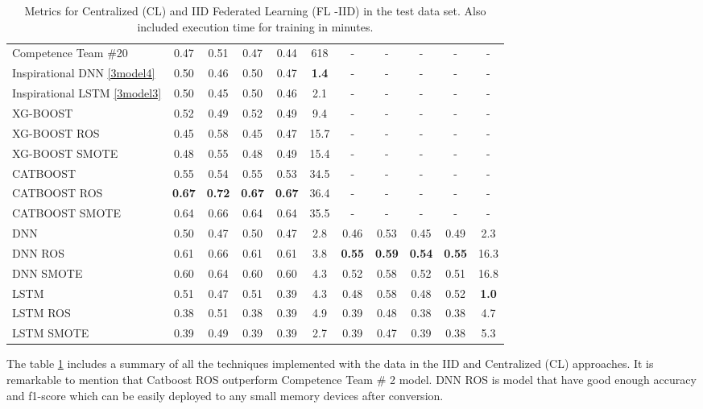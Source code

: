 \begin{table}[ht]
\begin{center}
\begin{adjustbox}{width=\textwidth}
\begin{tabular}{|l|*{5}{c}|*{5}{c}|}
\multicolumn{1}{|l|}{Competence Team \#20 \cite{team_20}} & 0.47 & 0.51 & 0.47 & 0.44 & 618 & - & - & - & - & - \\
\multicolumn{1}{|l|}{Inspirational DNN \ref{3model4}} & 0.50 & 0.46 & 0.50 & 0.47 & \textbf{1.4} & - & - & - & - & -  \\
\multicolumn{1}{|l|}{Inspirational LSTM \ref{3model3}} & 0.50 & 0.45 & 0.50 & 0.46 & 2.1 & - & - & - & - & -  \\
\hline\hline
\multicolumn{1}{|l|}{XG-BOOST} & 0.52 & 0.49 & 0.52 & 0.49 & 9.4 & - & - & - & - & -  \\
\multicolumn{1}{|l|}{XG-BOOST ROS} & 0.45 & 0.58 & 0.45 & 0.47 & 15.7 & - & - & - & - & - \\ 
\multicolumn{1}{|l|}{XG-BOOST SMOTE} & 0.48 & 0.55 & 0.48 & 0.49 & 15.4 & - & - & - & - & -  \\
\multicolumn{1}{|l|}{CATBOOST} & 0.55 & 0.54 & 0.55 & 0.53 & 34.5 & - & - & - & - & - \\
\multicolumn{1}{|l|}{CATBOOST ROS} & \textbf{0.67} & \textbf{0.72} &\textbf{ 0.67 }& \textbf{0.67} & 36.4 & - & - & - & - & -  \\
\multicolumn{1}{|l|}{CATBOOST SMOTE} & 0.64 & 0.66 & 0.64 & 0.64 & 35.5 & - & - & - & - & -  \\
\hline\hline
\multicolumn{1}{|l|}{DNN} & 0.50 & 0.47 & 0.50 & 0.47 & 2.8 & 0.46 & 0.53 & 0.45 & 0.49 & 2.3  \\
\multicolumn{1}{|l|}{DNN ROS} & 0.61 & 0.66 & 0.61 & 0.61 & 3.8 & \textbf{0.55} & \textbf{0.59} & \textbf{0.54} & \textbf{0.55} & 16.3  \\
\multicolumn{1}{|l|}{DNN SMOTE} & 0.60 & 0.64 & 0.60 & 0.60 & 4.3 & 0.52 & 0.58 & 0.52 & 0.51 & 16.8  \\
\hline\hline
\multicolumn{1}{|l|}{LSTM} & 0.51 & 0.47 & 0.51 & 0.39 & 4.3 & 0.48 & 0.58 & 0.48 & 0.52 & \textbf{1.0}  \\ 
\multicolumn{1}{|l|}{LSTM ROS} & 0.38 & 0.51 & 0.38 & 0.39 & 4.9 & 0.39 & 0.48 & 0.38 & 0.38 & 4.7  \\
\multicolumn{1}{|l|}{LSTM SMOTE} & 0.39 & 0.49 & 0.39 & 0.39 & 2.7 & 0.39 & 0.47 & 0.39 & 0.38 & 5.3  \\
\hline
\end{tabular}
\end{adjustbox}
\end{center}
\caption{Metrics for Centralized (CL) and IID Federated Learning (FL -IID) in the test data set. Also included execution time for training in minutes.}
\label{table:metrics_CL_FLIID}
\end{table}

The table \ref{table:metrics_CL_FLIID} includes a summary of all the techniques implemented with the data in the IID and Centralized (CL) approaches. It is remarkable to mention that Catboost ROS outperform Competence Team \# 2 model. DNN ROS is model that have good enough accuracy and f1-score which can be easily deployed to any small memory devices after conversion.  